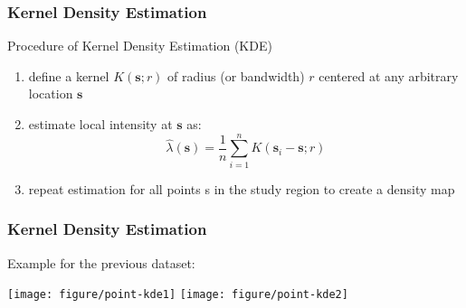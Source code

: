 \documentclass[10pt]{beamer}\usepackage[]{graphicx}\usepackage[]{color}
\newenvironment{knitrout}{}{} %
\newcommand{\vecss}{\boldsymbol{s}}
\newcommand{\bfigure}{\begin{figure}}
\newcommand{\efigure}{\end{figure}}
\newcommand{\benumer}{\begin{enumerate}}
\newcommand{\eenumer}{\end{enumerate}}
\newcommand{\bblock}{\begin{block}}
\newcommand{\eblock}{\end{block}}
\begin{document}
\begin{frame}
\frametitle{Kernel Density Estimation}
\bblock{Procedure of Kernel Density Estimation (KDE)}
\benumer
\item define a kernel $K(\vecss;r)$ of radius (or bandwidth) $r$ centered at any arbitrary location $\vecss$
\item estimate local intensity at $\vecss$ as:
\[
\hat{\lambda}(\vecss) = \frac{1}{n}\sum\limits_{i=1}^{n}K(\vecss_i-\vecss;r)
\]
\item repeat estimation for all points s in the study region to create a density map
\eenumer

\bfigure
{}
\efigure

\eblock


\end{frame}

\begin{frame}
\frametitle{Kernel Density Estimation}
\bblock{Example for the previous dataset:}
\begin{knitrout}
\color{fgcolor}

{\centering \texttt{[image: figure/point-kde1]} 
\texttt{[image: figure/point-kde2]} 

}



\end{knitrout}

\eblock

\end{frame}
\end{document}

